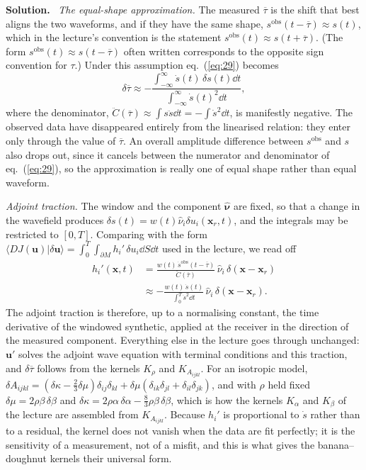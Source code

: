 \documentclass[a4paper,12pt]{paper}
\newenvironment{solution}{\par\noindent\textbf{Solution.}\ }{\par\medskip}
\begin{document}
\begin{solution}
\emph{The equal-shape approximation.} The measured $\overline{\tau}$ is the shift that best aligns the two waveforms, and if
they have the same shape, $s^{\mathrm{obs}}(t-\overline{\tau})\approx s(t)$, which in the lecture's convention is the
statement $s^{\mathrm{obs}}(t)\approx s(t+\overline{\tau})$. (The form $s^{\mathrm{obs}}(t)\approx s(t-\overline{\tau})$ often written
corresponds to the opposite sign convention for $\tau$.) Under this assumption eq.~(\ref{eq:29}) becomes
\begin{equation}
\delta\overline{\tau}\approx-\frac{\displaystyle\int_{-\infty}^{\infty}\dot{s}(t)\,\delta s(t)\dd t}{\displaystyle\int_{-\infty}^{\infty}\dot{s}(t)^{2}\dd t},
\label{eq:31}
\end{equation}
where the denominator, $\ddot{C}(\overline{\tau})\approx\int s\ddot{s}\dd t=-\int\dot{s}^{2}\dd t$, is manifestly negative.
The observed data have disappeared entirely from the linearised relation: they enter only through the value of
$\overline{\tau}$. An overall amplitude difference between $s^{\mathrm{obs}}$ and $s$ also drops out, since it cancels between the
numerator and denominator of eq.~(\ref{eq:29}), so the approximation is really one of equal shape rather than equal waveform.

\emph{Adjoint traction.} The window and the component $\hat{\bm{\nu}}$ are fixed, so that a change in the wavefield
produces $\delta s(t)=w(t)\hat{\nu}_{i}\delta u_{i}(\mathbf{x}_{r},t)$, and the integrals may be restricted to $[0,T]$.
Comparing with the form
$\langle DJ(\mathbf{u})|\delta\mathbf{u}\rangle=\int_{0}^{T}\int_{\partial M}h_{i}'\,\delta u_{i}\dd S\dd t$ used in the
lecture, we read off
\begin{align}
h_{i}'(\mathbf{x},t)&=\frac{w(t)\,\dot{s}^{\mathrm{obs}}(t-\overline{\tau})}{\ddot{C}(\overline{\tau})}\,\hat{\nu}_{i}\,\delta(\mathbf{x}-\mathbf{x}_{r}) \nonumber \\
&\approx-\frac{w(t)\,\dot{s}(t)}{\int_{0}^{T}\dot{s}^{2}\dd t}\,\hat{\nu}_{i}\,\delta(\mathbf{x}-\mathbf{x}_{r}).
\label{eq:32}
\end{align}
The adjoint traction is therefore, up to a normalising constant, the time derivative of the windowed synthetic, applied at the
receiver in the direction of the measured component. Everything else in the lecture goes through unchanged: $\mathbf{u}'$
solves the adjoint wave equation with terminal conditions and this traction, and $\delta\overline{\tau}$ follows from the
kernels $K_{\rho}$ and $K_{A_{ijkl}}$. For an isotropic model,
$\delta A_{ijkl}=(\delta\kappa-\frac{2}{3}\delta\mu)\delta_{ij}\delta_{kl}+\delta\mu(\delta_{ik}\delta_{jl}+\delta_{il}\delta_{jk})$,
and with $\rho$ held fixed $\delta\mu=2\rho\beta\,\delta\beta$ and $\delta\kappa=2\rho\alpha\,\delta\alpha-\frac{8}{3}\rho\beta\,\delta\beta$,
which is how the kernels $K_{\alpha}$ and $K_{\beta}$ of the lecture are assembled from $K_{A_{ijkl}}$. Because $h_{i}'$ is
proportional to $\dot{s}$ rather than to a residual, the kernel does not vanish when the data are fit perfectly; it is the
sensitivity of a measurement, not of a misfit, and this is what gives the banana--doughnut kernels their universal form.


\end{solution}
\end{document}
